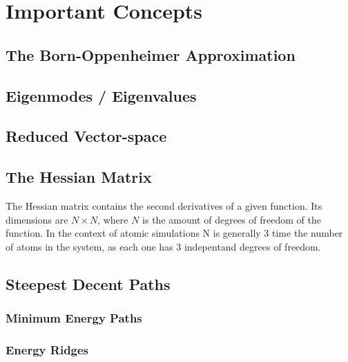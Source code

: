\section{Important Concepts}
\subsection{The Born-Oppenheimer Approximation}
\placeholder

\subsection{Eigenmodes / Eigenvalues}
\placeholder

\subsection{Reduced Vector-space}
\placeholder

\subsection{The Hessian Matrix}
The Hessian matrix contains the second derivatives of a given function.
Its dimensions are $N\times N$, where $N$ is the amount of degrees of freedom of the function.
In the context of atomic simulations N is generally 3 time the number of atoms in the system, as each one has 3 indepentand degrees of freedom.
\incomplete

\subsection{Steepest Decent Paths}
\placeholder
\subsubsection{Minimum Energy Paths}
\placeholder
\subsubsection{Energy Ridges}
\placeholder
